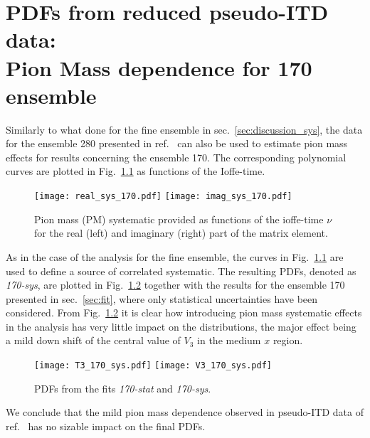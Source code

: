 \chapter{PDFs from reduced pseudo-ITD data:  \\ Pion Mass dependence for 170 ensemble}
Similarly to what done for the fine ensemble in sec.~\ref{sec:discussion_sys},
the data for the ensemble 280 presented in ref.~\cite{Joo:2020spy} can also be used to estimate pion mass effects
for results concerning the ensemble 170. The corresponding polynomial curves are plotted in Fig.~\ref{fig:sys_170}
as functions of the Ioffe-time.
\begin{figure}[h!]
    \centering
    \texttt{[image: real\_sys\_170.pdf]}  
    \texttt{[image: imag\_sys\_170.pdf]}
\caption{Pion mass (PM) systematic provided 
as functions of the ioffe-time $\nu$ for the real (left) and imaginary (right) part 
of the matrix element.}
\label{fig:sys_170}
\end{figure}

%
As in the case of the analysis for the fine ensemble, the curves in Fig.~\ref{fig:sys_170} are used 
to define a source of correlated systematic. The resulting PDFs, denoted as \textit{170-sys}, are 
plotted in Fig.~\ref{fig:res_170_sys} together with the results for the ensemble 170 presented in sec.~\ref{sec:fit},
where only statistical uncertainties have been considered.
From Fig.~\ref{fig:res_170_sys} it is clear how introducing pion mass systematic effects in the analysis has very little impact on
the distributions, the major effect being a mild down shift of the central value of $V_3$ in the medium $x$ region.
\begin{figure}[h!]
    \centering
    \texttt{[image: T3\_170\_sys.pdf]}  
    \texttt{[image: V3\_170\_sys.pdf]}
\caption{PDFs from the fits \textit{170-stat} and \textit{170-sys}.}
\label{fig:res_170_sys}
\end{figure}
We conclude that the mild pion mass dependence observed in pseudo-ITD data of ref.~\cite{Joo:2020spy} has no sizable impact
on the final PDFs.
